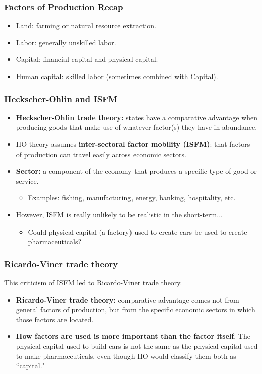 \documentclass[handout]{beamer}
\begin{document}
\begin{frame} 
	\frametitle{\LARGE{Factors of Production Recap}}
	\begin{itemize}
			\item Land: farming or natural resource extraction. \pause
			\item Labor: generally unskilled labor. \pause
			\item Capital: financial capital and physical capital. \pause
			\item Human capital: skilled labor (sometimes combined with Capital).		
	\end{itemize}
\end{frame}

\begin{frame} 
	\frametitle{\LARGE{Heckscher-Ohlin and ISFM}}
	\begin{itemize}
		\item \textbf{Heckscher-Ohlin trade theory:} states have a comparative advantage when producing goods that make use of whatever factor(s) they have in abundance. \pause 
			\item HO theory assumes \textbf{inter-sectoral factor mobility (ISFM)}: that factors of production can travel easily across economic sectors. \pause
			\item \textbf{Sector:} a component of the economy that produces a specific type of good or service. \pause 
			\begin{itemize}
			    \item Examples: fishing, manufacturing, energy, banking, hospitality, etc. \pause
			\end{itemize}
			\item However, ISFM is really unlikely to be realistic in the short-term... \pause
			\begin{itemize}
			    \item Could physical capital (a factory) used to create cars be used to create pharmaceuticals?
			\end{itemize}		
	\end{itemize}
\end{frame}

\begin{frame} 
	\frametitle{\LARGE{Ricardo-Viner trade theory}}
This criticism of ISFM led to Ricardo-Viner trade theory. \pause
	\begin{itemize}
		\item \textbf{Ricardo-Viner trade theory:} comparative advantage comes not from general factors of production, but from the specific economic sectors in which those factors are located. \pause 
		\item \textbf{How factors are used is more important than the factor itself}. The physical capital used to build cars is not the same as the physical capital used to make pharmaceuticals, even though HO would classify them both as ``capital."
	\end{itemize}
\end{frame}
\end{document}
